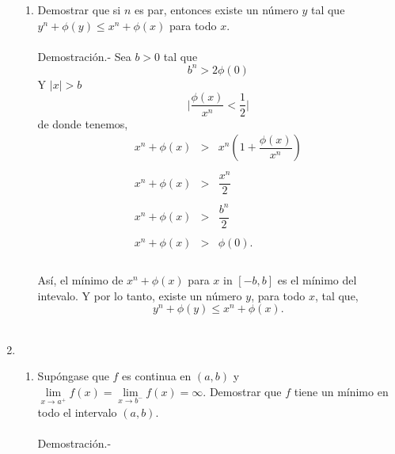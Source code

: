 \begin{enumerate}
\begin{enumerate}[\bfseries (a)]
	\item Demostrar que si $n$ es par, entonces existe un número $y$ tal que $y^n+\phi(y)\leq x^n + \phi(x)$ para todo $x$.\\\\
	    Demostración.-\; Sea $b>0$ tal que 
	    $$b^n>2\phi(0)$$
	    Y $|x|>b$ 
	    $$\bigg|\dfrac{\phi(x)}{x^n}<\dfrac{1}{2}\bigg|$$
	    de donde tenemos,
	    $$\begin{array}{rcl}
		x^n+\phi(x)&>&x^n\left(1+\dfrac{\phi(x)}{x^n}\right)\\\\
		x^n+\phi(x)&>&\dfrac{x^n}{2}\\\\
		x^n+\phi(x)&>&\dfrac{b^n}{2}\\\\
		x^n+\phi(x)&>&\phi(0).\\\\
	    \end{array}$$

	    Así, el mínimo de $x^n+\phi(x)$ para $x$ in $[-b,b]$ es el mínimo del intevalo.
	    Y por lo tanto, existe un número $y$, para todo $x$, tal que,
	    $$y^n+\phi(y)\leq x^n +\phi(x).$$\\

    \end{enumerate}

\item 
    \begin{enumerate}[\bfseries (a)]

	\item Supóngase que $f$ es continua en $(a,b)$ y $\lim\limits_{x\to a^+} f(x)=\lim\limits_{x\to b^-} f(x)=\infty$. Demostrar que $f$ tiene un mínimo en todo el intervalo $(a,b)$.\\\\
	    Demostración.-\;

    \end{enumerate}

\end{enumerate}
